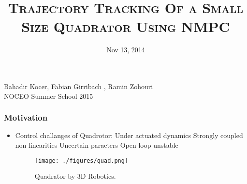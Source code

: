 \documentclass[13pt	]{beamer}
\title{\large\textsc{Trajectory Tracking Of a Small Size Quadrator Using NMPC}}
\date{Nov 13, 2014}
\begin{document}
\begin{frame}
\titlepage
\begin{center}

\textsf{\footnotesize Bahadir Kocer, Fabian Girribach , Ramin Zohouri}\\
\textsf{\footnotesize NOCEO Summer School 2015}\\

\end{center}
\end{frame} 


\begin{frame}
\frametitle{Motivation}
\begin{itemize}
\item Control challanges of Quadrotor:
\subitem Under actuated dynamics
\subitem Strongly coupled non-linearities
\subitem Uncertain paraeters
\subitem Open loop unstable
\begin{figure}
\texttt{[image: ./figures/quad.png]}
\caption{\tiny Quadrator by 3D-Robotics.}
\end{figure}
\end{itemize}


\end{frame}
\end{document}
